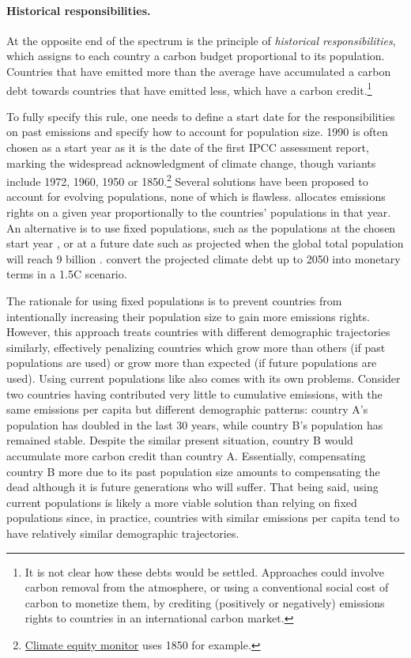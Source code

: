 \paragraph{Historical responsibilities.} At the opposite end of the spectrum is the principle of \textit{historical responsibilities}, which assigns to each country a carbon budget proportional to its population. Countries that have emitted more than the average have accumulated a carbon debt towards countries that have emitted less, which have a carbon credit.\footnote{It is not clear how these debts would be settled. Approaches could involve carbon removal from the atmosphere, or using a conventional social cost of carbon to monetize them, by crediting (positively or negatively) emissions rights to countries in an international carbon market.} 

To fully specify this rule, one needs to define a start date for the responsibilities on past emissions and specify how to account for population size. 1990 is often chosen as a start year as it is the date of the first IPCC assessment report, marking the widespread acknowledgment of climate change, though variants include 1972, 1960, 1950 or 1850.\footnote{\href{https://climateequitymonitor.in}{Climate equity monitor} uses 1850 for example.} Several solutions have been proposed to account for evolving populations, none of which is flawless.  allocates emissions rights on a given year proportionally to the countries' populations in that year. An alternative is to use fixed populations, such as the populations at the chosen start year , or at a future date such as projected when the global total population will reach 9 billion .  convert the projected climate debt up to 2050 into monetary terms in a 1.5\textdegree{}C scenario.%

The rationale for using fixed populations is to prevent countries from intentionally increasing their population size to gain more emissions rights. However, this approach treats countries with different demographic trajectories similarly, effectively penalizing countries which grow more than others (if past populations are used) or grow more than expected (if future populations are used). Using current populations like  also comes with its own problems. Consider two countries having contributed very little to cumulative emissions, with the same emissions per capita but different demographic patterns: country A's population has doubled in the last 30 years, while country B's population has remained stable. Despite the similar present situation, country B would accumulate more carbon credit than country A. Essentially, compensating country B more due to its past population size amounts to compensating the dead although it is future generations who will suffer. That being said, using current populations is likely a more viable solution than relying on fixed populations since, in practice, countries with similar emissions per capita tend to have relatively similar demographic trajectories.

